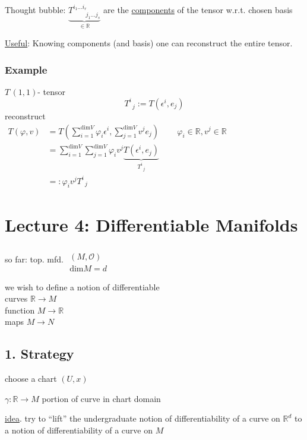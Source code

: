 Thought bubble: $\underbrace{T^{i_1 \dots i_r}_{ \qquad \, j_1 \dots j_s} }_{\in \mathbb{R}}$ are the \underline{components} of the tensor w.r.t. chosen basis

\underline{Useful}: Knowing components (and basis) one can reconstruct the entire tensor.

\subsubsection*{Example} $T \, (1,1)$- tensor
\[
T^i_{ \; \; j} := T(\epsilon^i, e_j)
\]
reconstruct \\
$\begin{aligned} 
T(\varphi,v) & =T(\sum_{i=1}^{\text{dim}{V}}\varphi_i \epsilon^i, \sum_{j=1}^{\text{dim}V} v^j e_j)   \qquad \, \varphi_i \in \mathbb{R}, v^j \in \mathbb{R} \\ 
&  = \sum_{i=1}^{\text{dim}V} \sum_{j=1}^{\text{dim}{V}} \varphi_i v^j \underbrace{ T(\epsilon^i, e_j) }_{T^i_{ \; \; j}} \\
& =: \varphi_i v^j T^i_{ \; \; j}
\end{aligned}$







\section{Lecture 4: Differentiable Manifolds}

so far: top. mfd. $\begin{gathered}  \quad \\ 
(M,\mathcal{O}) \\
\text{dim}M = d \end{gathered}$

we wish to define a notion of differentiable  \\
\phantom{ \quad \quad \, } curves $\mathbb{R} \to M$ \\
\phantom{ \quad \quad \, } function $M \to \mathbb{R}$ \\
\phantom{ \quad \quad \, } maps $M \to N$

\subsection{1. Strategy}  choose a chart $(U,x)$ 

$\gamma : \mathbb{R} \to M$  portion of curve in chart domain


\underline{idea}. try to ``lift'' the undergraduate notion of differentiability of a curve on $\mathbb{R}^d$ to a notion of differentiability of a curve on $M$

